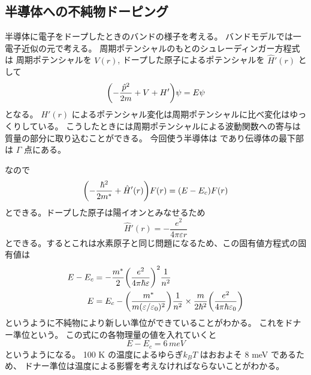 \documentclass[11pt,dvipdfmx,a4paper]{jsarticle}
\begin{document}
\subsection{半導体への不純物ドーピング}
半導体に電子をドープしたときのバンドの様子を考える。
バンドモデルでは一電子近似の元で考える。
周期ポテンシャルのもとのシュレーディンガー方程式は
周期ポテンシャルを \(V(r)\), ドープした原子によるポテンシャルを \(\hat{H}'(r)\) として
\begin{equation}
	\qty(-\frac{\hat{p}^2}{2m}+V+H')\psi = E \psi
\end{equation}
となる。
\(H'(r)\) によるポテンシャル変化は周期ポテンシャルに比べ変化はゆっくりしている。
こうしたときには周期ポテンシャルによる波動関数への寄与は質量の部分に取り込むことができる。
今回使う半導体は  であり伝導体の最下部は \(\Gamma\) 点にある。

なので
\begin{equation}
	\qty(-\frac{\hbar^2}{2m^*}+\hat{H}'(r))F(r) = (E-E_c)F(r)
\end{equation}
とできる。ドープした原子は陽イオンとみなせるため
\begin{equation}
	\hat{H}'(r) = -\frac{e^2}{4\pi\varepsilon r}
\end{equation}
とできる。するとこれは水素原子と同じ問題になるため、この固有値方程式の固有値は
\begin{align}
	E-E_c &= -\frac{m^*}{2}\qty(\frac{e^2}{4\pi\hbar\varepsilon})^2\frac{1}{n^2}\\
    E &= E_c -\qty(\frac{m^*}{m(\varepsilon/\varepsilon_0)^2})\frac{1}{n^2}\times\frac{m}{2\hbar^2}\qty(\frac{e^2}{4\pi \hbar\varepsilon_0})
\end{align}
というように不純物により新しい準位ができていることがわかる。
これをドナー準位という。
この式にの各物理量の値を入れていくと
\begin{equation}
    E-E_c = 6\,\si{meV}
\end{equation}
というようになる。
100 K の温度によるゆらぎ\(k_B T\) はおおよそ 8 meV であるため、
ドナー準位は温度による影響を考えなければならないことがわかる。
\end{document}

